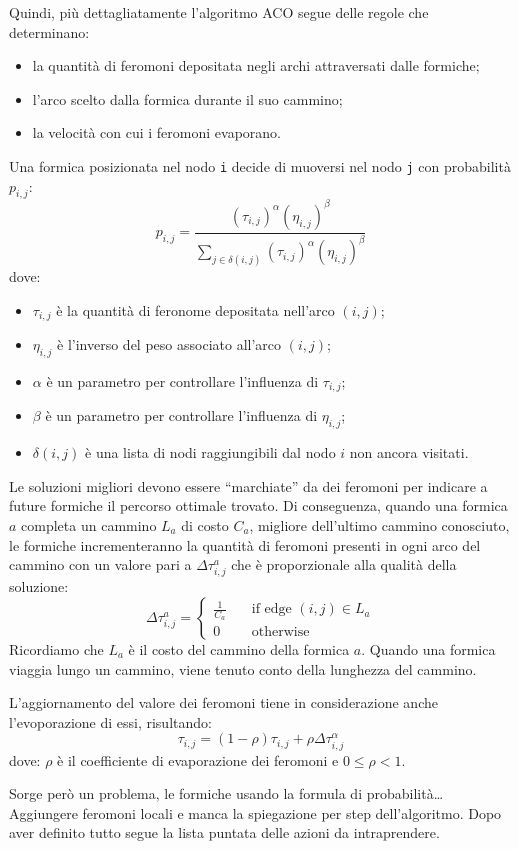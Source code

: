 Quindi, più dettagliatamente l'algoritmo ACO segue delle regole che determinano:
\begin{itemize}
    \item la quantità di feromoni depositata negli archi attraversati dalle formiche;
    \item l'arco scelto dalla formica durante il suo cammino;
    \item la velocità con cui i feromoni evaporano.
\end{itemize}
Una formica posizionata nel nodo \texttt{i} decide di muoversi nel nodo \texttt{j} con probabilità $p_{i,j}$:
\[ p_{i,j} = \frac{{(\tau_{i,j})}^{\alpha}{(\eta_{i,j})}^\beta}{\sum_{j \in \delta(i,j)}{(\tau_{i,j})}^{\alpha}{(\eta_{i,j})}^\beta} \] 
dove:
\begin{itemize}
    \item $\tau_{i,j}$ è la quantità di feronome depositata nell'arco $(i,j)$;
    \item $\eta_{i,j}$ è l'inverso del peso associato all'arco $(i,j)$;
    \item $\alpha$ è un parametro per controllare l'influenza di $\tau_{i,j}$;
    \item $\beta$ è un parametro per controllare l'influenza di $\eta_{i,j}$;
    \item $\delta(i,j)$ è una lista di nodi raggiungibili dal nodo $i$ non ancora visitati.
\end{itemize}
Le soluzioni migliori devono essere ``marchiate'' da dei feromoni per indicare a future formiche il percorso ottimale trovato.
Di conseguenza, quando una formica $a$ completa un cammino $L_a$ di costo $C_a$, 
migliore dell'ultimo cammino conosciuto, le formiche incrementeranno la quantità di 
feromoni presenti in ogni arco del cammino con un valore pari a $\Delta\tau_{i,j}^a$ che è proporzionale alla qualità della soluzione:
\[ \Delta\tau_{i,j}^a = 
    \begin{cases}
    {\frac{1}{C_a}}       & \quad \text{if edge } (i,j) \in L_a\\
    0                     & \quad \text{otherwise}
    \end{cases}
\]
Ricordiamo che $L_a$ è il costo del cammino della formica $a$. Quando una formica viaggia lungo un cammino, viene tenuto conto della lunghezza del cammino. 

L'aggiornamento del valore dei feromoni tiene in considerazione anche l'evoporazione di essi, risultando:
\[
    \tau_{i,j} = (1 - \rho) \tau_{i,j} + \rho \Delta \tau_{i,j}^\alpha
    \]
dove: $\rho$ è il coefficiente di evaporazione dei feromoni e $0 \leq \rho < 1$.

Sorge però un problema, le formiche usando la formula di probabilità\dots
Aggiungere feromoni locali e manca la spiegazione per step dell'algoritmo.
Dopo aver definito tutto segue la lista puntata delle azioni da intraprendere.



